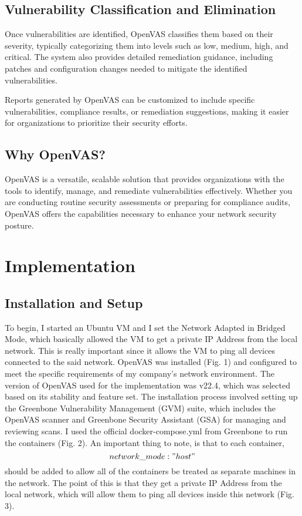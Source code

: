 \documentclass[twocolumn]{article}
\begin{document}
\subsection{Vulnerability Classification and Elimination}

Once vulnerabilities are identified, OpenVAS classifies them based on their severity, typically categorizing them into levels such as low, medium, high, and critical. The system also provides detailed remediation guidance, including patches and configuration changes needed to mitigate the identified vulnerabilities.

Reports generated by OpenVAS can be customized to include specific vulnerabilities, compliance results, or remediation suggestions, making it easier for organizations to prioritize their security efforts.

\subsection{Why OpenVAS?}

OpenVAS is a versatile, scalable solution that provides organizations with the tools to identify, manage, and remediate vulnerabilities effectively. Whether you are conducting routine security assessments or preparing for compliance audits, OpenVAS offers the capabilities necessary to enhance your network security posture.

\section{Implementation}

\subsection{Installation and Setup}

To begin, I started an Ubuntu VM and I set the Network Adapted in Bridged Mode, which basically allowed the VM to get a private IP Address from the local network. This is really important since it allows the VM to ping all devices connected to the said network. OpenVAS was installed (Fig. 1) and configured to meet the specific requirements of my company's network environment. The version of OpenVAS used for the implementation was v22.4, which was selected based on its stability and feature set. The installation process involved setting up the Greenbone Vulnerability Management (GVM) suite, which includes the OpenVAS scanner and Greenbone Security Assistant (GSA) for managing and reviewing scans. I used the official docker-compose.yml from Greenbone to run the containers (Fig. 2). An important thing to note, is that to each container, $$network\_mode: "host"$$ should be added to allow all of the containers be treated as separate machines in the network. The point of this is that they get a private IP Address from the local network, which will allow them to ping all devices inside this network (Fig. 3).
\end{document}
